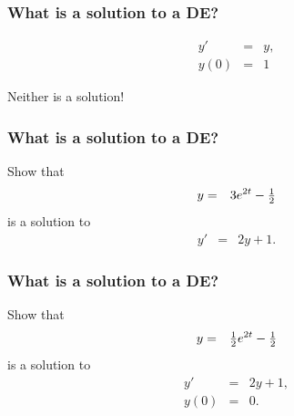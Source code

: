 \begin{frame}
  \frametitle{What is a solution to a DE?}

  \begin{eqnarray*}
    y' & = & y, \\
    y(0) & = & 1
  \end{eqnarray*}

  Neither is a solution! 


\end{frame}


\begin{frame}
  \frametitle{What is a solution to a DE?}

  Show that 
  \begin{eqnarray*}
    y & = & 3 e^{2t} - \mbox{$\frac{1}{2}$}
  \end{eqnarray*}
  is a solution to
  \begin{eqnarray*}
    y' & = & 2y + 1.
  \end{eqnarray*}



\end{frame}


\begin{frame}
  \frametitle{What is a solution to a DE?}

  Show that 
  \begin{eqnarray*}
    y & = & \mbox{$\frac{1}{2}$} e^{2t} - \mbox{$\frac{1}{2}$}
  \end{eqnarray*}
  is a solution to
  \begin{eqnarray*}
    y' & = & 2y + 1, \\
    y(0) & = & 0.
  \end{eqnarray*}




\end{frame}



